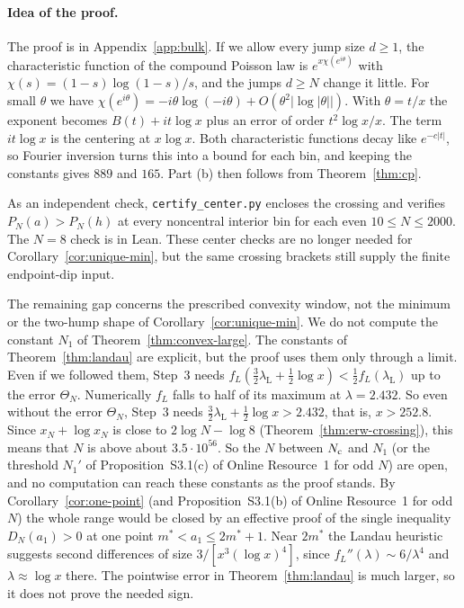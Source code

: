 \paragraph{Idea of the proof.}
The proof is in Appendix~\ref{app:bulk}. If we allow every jump size
$d\ge1$, the characteristic function of the compound Poisson law is
$e^{x\chi(e^{i\theta})}$ with $\chi(s)=(1-s)\log(1-s)/s$, and the jumps
$d\ge N$ change it little. For small $\theta$ we have
$\chi(e^{i\theta})=-i\theta\log(-i\theta)+O(\theta^2\lvert\log\lvert\theta\rvert\rvert)$.
With $\theta=t/x$ the exponent becomes $B(t)+it\log x$ plus an error of
order $t^2\log x/x$. The term $it\log x$ is the centering at $x\log x$. Both
characteristic functions decay like $e^{-c\lvert t\rvert}$, so Fourier
inversion turns this into a bound for each bin, and keeping the constants gives
$889$ and $165$. Part (b) then follows from Theorem~\ref{thm:cp}.



As an independent check, \texttt{certify\_center.py} encloses the crossing
and verifies $P_N(a)>P_N(h)$ at every noncentral interior bin for each even
$10\le N\le2000$. The $N=8$ check is in Lean. These center checks are no
longer needed for Corollary~\ref{cor:unique-min}, but the same crossing
brackets still supply the finite endpoint-dip input.



\begin{remark}\label{rem:convex-open}
The remaining gap concerns the prescribed convexity window, not the minimum
or the two-hump shape of Corollary~\ref{cor:unique-min}.
We do not compute the constant $N_1$ of Theorem~\ref{thm:convex-large}. The constants of
Theorem~\ref{thm:landau} are explicit, but the proof uses them only through a limit. Even if
we followed them, Step~3 needs $f_L(\frac32\lambda_{\mathrm L}+\frac12\log x)<\frac12f_L(\lambda_{\mathrm L})$ up
to the error $\Theta_N$. Numerically $f_L$ falls to half of its maximum at
$\lambda=2.432$. So even without the error $\Theta_N$, Step~3 needs
$\frac32\lambda_{\mathrm L}+\frac12\log x>2.432$, that is, $x>252.8$. Since
$x_N+\log x_N$ is close to $2\log N-\log8$ (Theorem~\ref{thm:erw-crossing}), this means that $N$
is above about $3.5\cdot10^{56}$. So the $N$ between $N_{\rm c}$ and $N_1$ (or the threshold $N_1'$ of Proposition~S3.1(c)
of Online Resource~1 for odd $N$) are open, and no
computation can reach these constants as the proof stands. By Corollary~\ref{cor:one-point}
(and Proposition~S3.1(b) of Online Resource~1 for odd $N$) the whole range would
be closed by an effective proof of the single inequality $D_N(a_1)>0$ at one point
$m^*<a_1\le2m^*+1$. Near $2m^*$ the Landau heuristic suggests second differences of size
$3/[x^3(\log x)^4]$, since $f_L''(\lambda)\sim6/\lambda^4$ and
$\lambda\approx\log x$ there. The pointwise error in Theorem~\ref{thm:landau}
is much larger, so it does not prove the needed sign.
\end{remark}

